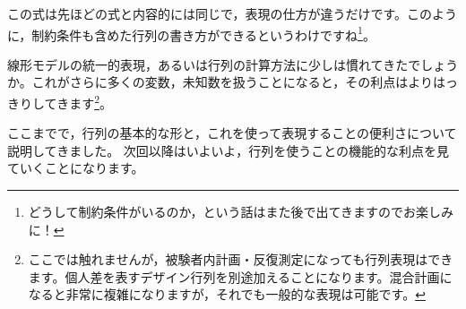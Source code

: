 \documentclass{ltjsbook}
\begin{document}
この式は先ほどの式と内容的には同じで，表現の仕方が違うだけです。このように，制約条件も含めた行列の書き方ができるというわけですね\footnote{どうして制約条件がいるのか，という話はまた後で出てきますのでお楽しみに！\label{Desing_constraint}}。

線形モデルの統一的表現，あるいは行列の計算方法に少しは慣れてきたでしょうか。これがさらに多くの変数，未知数を扱うことになると，その利点はよりはっきりしてきます\footnote{ここでは触れませんが，被験者内計画・反復測定になっても行列表現はできます。個人差を表すデザイン行列を別途加えることになります。混合計画になると非常に複雑になりますが，それでも一般的な表現は可能です。}。

\vspace{2cm}

ここまでで，行列の基本的な形と，これを使って表現することの便利さについて説明してきました。
次回以降はいよいよ，行列を使うことの機能的な利点を見ていくことになります。
\end{document}
